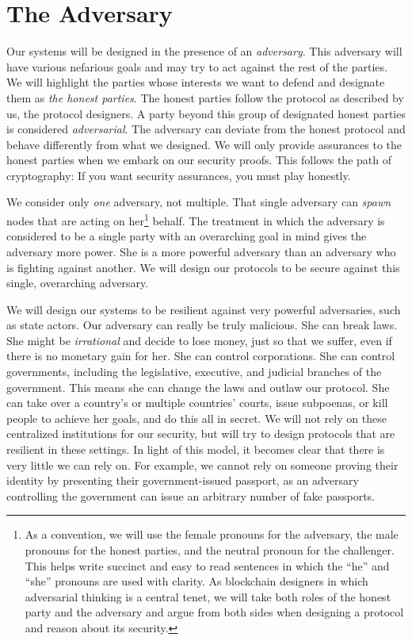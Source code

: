 \section{The Adversary}

Our systems will be designed in the presence of an \emph{adversary}. This adversary will
have various nefarious goals and may try to act against the rest of the parties. We will
highlight the parties whose interests we want to defend and designate them as
\emph{the honest parties}. The honest parties follow the protocol as described by us,
the protocol designers. A party beyond this group of designated honest parties is considered \emph{adversarial}.
The adversary can deviate from the honest protocol and behave differently from what we designed.
We will only provide assurances to the honest parties when we embark on our security proofs.
This follows the path of cryptography: If you want security assurances, you must play honestly.

We consider only \emph{one} adversary, not multiple. That single adversary can \emph{spawn}
nodes that are acting on her\footnote{As a convention, we will use the female pronouns for the adversary, the male pronouns for the honest
parties, and the neutral pronoun for the challenger.
This helps write succinct and easy to read sentences in which the ``he'' and ``she'' pronouns
are used with clarity. As blockchain designers in which adversarial thinking is a central tenet, we will
take both roles of the honest party and the adversary and argue from both sides when designing a protocol
and reason about its security.} behalf. The treatment in which the adversary is considered to be
a single party with an overarching goal in mind gives the adversary more power. She is a more
powerful adversary than an adversary who is fighting against another. We will design our protocols
to be secure against this single, overarching adversary.

We will design our systems to be resilient against very powerful adversaries, such as state
actors. Our adversary can really be truly malicious. She can break laws. She might be \emph{irrational}
and decide to lose money, just so that we suffer, even if there is no monetary gain for her.
She can control corporations. She can control governments, including the legislative, executive,
and judicial branches of the government. This means she can change the laws and outlaw our protocol.
She can take over a country's or multiple countries'
courts, issue subpoenas, or kill people to achieve her goals, and do this all in secret.
We will not rely on these centralized institutions
for our security, but will try to design protocols that are resilient in these settings.
In light of this model, it becomes clear that there is very little we can rely
on. For example, we cannot rely on someone proving their identity by presenting their government-issued
passport, as an adversary controlling the government can issue an arbitrary number of fake
passports.

